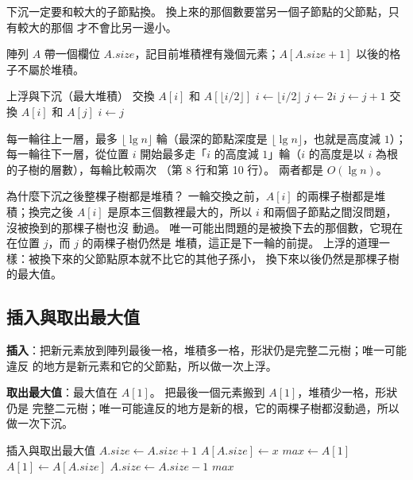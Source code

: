 下沉一定要和較大的子節點換。 換上來的那個數要當另一個子節點的父節點，只有較大的那個
才不會比另一邊小。

陣列 $A$ 帶一個欄位 $A.\mathit{size}$，記目前堆積裡有幾個元素；$A[A.\mathit{size}+1]$
以後的格子不屬於堆積。

\begin{pseudo}[label=alg:hp-sift]{上浮與下沉（最大堆積）}
        \State 交換 $A[i]$ 和 $A[\lfloor i/2 \rfloor]$
        \State $i \gets \lfloor i/2 \rfloor$
    \EndWhile
\EndProcedure
\Statex
{}
        \State $j \gets 2i$ 
            \State $j \gets j + 1$ 
        \EndIf
            \State \Return
        \EndIf
        \State 交換 $A[i]$ 和 $A[j]$
        \State $i \gets j$
    \EndWhile
\EndProcedure
\end{pseudo}

 每一輪往上一層，最多 $\lfloor \lg n \rfloor$ 輪（最深的節點深度是
$\lfloor \lg n \rfloor$，也就是高度減 $1$）； 每一輪往下一層，從位置 $i$
開始最多走「$i$ 的高度減 $1$」輪（$i$ 的高度是以 $i$ 為根的子樹的層數），每輪比較兩次
（第 8 行和第 10 行）。
兩者都是 $O(\lg n)$。

為什麼下沉之後整棵子樹都是堆積？ 一輪交換之前，$A[i]$ 的兩棵子樹都是堆積；換完之後
$A[i]$ 是原本三個數裡最大的，所以 $i$ 和兩個子節點之間沒問題，沒被換到的那棵子樹也沒
動過。 唯一可能出問題的是被換下去的那個數，它現在在位置 $j$，而 $j$ 的兩棵子樹仍然是
堆積，這正是下一輪的前提。 上浮的道理一樣：被換下來的父節點原本就不比它的其他子孫小，
換下來以後仍然是那棵子樹的最大值。

\subsection{插入與取出最大值}

\textbf{插入}：把新元素放到陣列最後一格，堆積多一格，形狀仍是完整二元樹；唯一可能違反
的地方是新元素和它的父節點，所以做一次上浮。

\textbf{取出最大值}：最大值在 $A[1]$。 把最後一個元素搬到 $A[1]$，堆積少一格，形狀仍是
完整二元樹；唯一可能違反的地方是新的根，它的兩棵子樹都沒動過，所以做一次下沉。

\begin{pseudo}[label=alg:hp-insert-extract, unbreakable]{插入與取出最大值}
 
    \State $A.\mathit{size} \gets A.\mathit{size} + 1$
    \State $A[A.\mathit{size}] \gets x$
    \State {}
\EndProcedure
\Statex
{}
        \State {}
    \EndIf
    \State $\mathit{max} \gets A[1]$
    \State $A[1] \gets A[A.\mathit{size}]$
    \State $A.\mathit{size} \gets A.\mathit{size} - 1$
    \State {}
    \State \Return $\mathit{max}$
\EndFunction
\end{pseudo}

